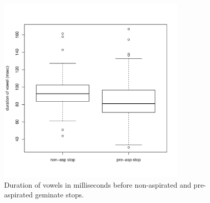 \documentclass[11pt,a4paper,oneside,openany]{memoir}\usepackage[]{graphicx}\usepackage[]{color}
\newenvironment{knitrout}{}{} %
\begin{document}
\begin{figure}
\centering
\begin{knitrout}
\color{fgcolor}
\includegraphics[width=0.8\textwidth]{img/vow-stop-1} 

\end{knitrout}
\caption{Duration of vowels in milliseconds before non-aspirated and pre-aspirated geminate stops.
}
\label{f:absvow}
\end{figure}
\end{document}
